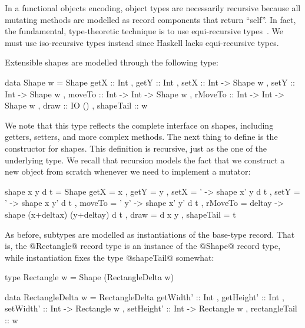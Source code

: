 \documentclass{jfp}
\begin{document}
In a functional objects encoding, object types are necessarily
recursive because all mutating methods are modelled as record
components that return ``self''. In fact, the fundamental,
type-theoretic technique is to use equi-recursive types~\cite{PT94}.
We must use iso-recursive types instead since Haskell lacks
equi-recursive types.

Extensible shapes are modelled through the following type:

\begin{code}
 data Shape w =
      Shape { getX      :: Int
            , getY      :: Int
            , setX      :: Int -> Shape w
            , setY      :: Int -> Shape w
            , moveTo    :: Int -> Int -> Shape w
            , rMoveTo   :: Int -> Int -> Shape w
            , draw      :: IO ()
            , shapeTail :: w
           }
\end{code}

We note that this type reflects the complete interface on shapes,
including getters, setters, and more complex methods. The next thing
to define is the constructor for shapes. This definition is recursive,
just as the one of the underlying type. We recall that recursion
models the fact that we construct a new object from scratch whenever
we need to implement a mutator:

\begin{code}
 shape x y d t
   = Shape { getX      = x
           , getY      = y
           , setX      = \x' -> shape x' y d t
           , setY      = \y' -> shape x y' d t
           , moveTo    = \x' y' -> shape x' y' d t
           , rMoveTo   = \deltax deltay -> shape (x+deltax) (y+deltay) d t
           , draw      = d x y
           , shapeTail = t
           }
\end{code}

As before, subtypes are modelled as instantiations of the base-type
record. That is, the @Rectangle@ record type is an instance of the
@Shape@ record type, while instantiation fixes the type @shapeTail@
somewhat:

\begin{code}
 type Rectangle w = Shape (RectangleDelta w)
\end{code}

\newpage

\begin{code}
 data RectangleDelta w =
      RectangleDelta { getWidth'     :: Int 
                     , getHeight'    :: Int
                     , setWidth'     :: Int -> Rectangle w
                     , setHeight'    :: Int -> Rectangle w
                     , rectangleTail :: w
                     }
\end{code}
\end{document}

